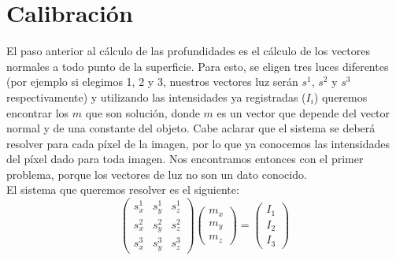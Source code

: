 

\section{Calibración}

El paso anterior al cálculo de las profundidades es el cálculo de los vectores normales a todo punto de la superficie. Para esto, se eligen tres luces diferentes (por ejemplo si elegimos 1, 2 y 3, nuestros vectores luz serán $s^{1}$, $s^{2}$ y $s^{3}$ respectivamente) y utilizando las intensidades ya registradas ($I_i$) queremos encontrar los $m$ que son solución, donde $m$ es un vector que depende del vector normal y de una constante del objeto. Cabe aclarar que el sistema se deberá resolver para cada píxel de la imagen, por lo que ya conocemos las intensidades del píxel dado para toda imagen. Nos encontramos entonces con el primer problema, porque los vectores de luz no son un dato conocido. \\

El sistema que queremos resolver es el siguiente: \\

\[
\begin{pmatrix}
    s_{x}^{1} & s_{y}^{1} & s_{z}^{1} \\
    s_{x}^{2} & s_{y}^{2} & s_{z}^{2} \\
    s_{x}^{3} & s_{y}^{3} & s_{z}^{3}
\end{pmatrix}
\begin{pmatrix}
    m_{x} \\
    m_{y} \\
    m_{z}
\end{pmatrix}
=
\begin{pmatrix}
    I_{1} \\
    I_{2} \\
    I_{3}
\end{pmatrix}
\]

